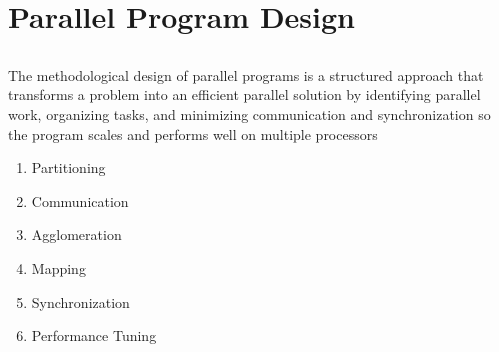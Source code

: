 \documentclass[12pt]{article}
\begin{document}
\section{Parallel Program Design}

\subsection{}
The methodological design of parallel programs is a structured approach that transforms a problem into an efficient parallel solution by identifying parallel work, organizing tasks, and minimizing communication and synchronization so the program scales and performs well on multiple processors\\
\begin{enumerate}
	\item Partitioning
	\item Communication
	\item Agglomeration
	\item Mapping
	\item Synchronization
	\item Performance Tuning
\end{enumerate}


%
%
\end{document}

